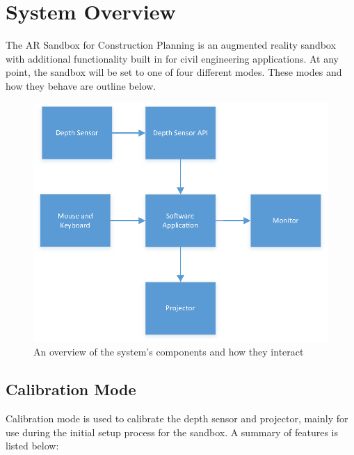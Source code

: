 \documentclass[onecolumn, draftclsnofoot,10pt, compsoc]{IEEEtran}
\begin{document}
\section{System Overview}


The AR Sandbox for Construction Planning is an augmented reality sandbox with additional functionality built in for civil engineering applications.
At any point, the sandbox will be set to one of four different modes.
These modes and how they behave are outline below.

\begin{figure}[H] 
	\centering
	\includegraphics[width=6in]{BlockDiagram}
    \caption{An overview of the system's components and how they interact}
    \label{fig:overview}
\end{figure}


\subsection{Calibration Mode}
Calibration mode is used to calibrate the depth sensor and projector, mainly for use during the initial set\-up process for the sandbox. A summary of features is listed below:
\end{document}
